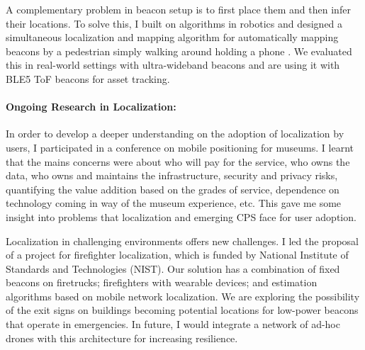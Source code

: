 \documentclass[11pt]{article}
\begin{document}
A complementary problem in beacon setup is to first place them and then infer their locations. %
To solve this, I built on algorithms in robotics and designed a simultaneous localization and mapping algorithm for automatically mapping beacons by a pedestrian simply walking around holding a phone \cite{mobileAR}. We evaluated this in real-world settings with ultra-wideband beacons and are using it with BLE5 ToF beacons for asset tracking. 

\paragraph{Ongoing Research in Localization: }
In order to develop a deeper understanding on the adoption of localization by users, I participated in a conference on mobile positioning for museums. 
I learnt that the mains concerns were about who will pay for the service, who owns the data, who owns and maintains the infrastructure, security and privacy risks, quantifying the value addition based on the grades of service, dependence on technology coming in way of the museum experience, etc. This gave me some insight into problems that localization and emerging CPS face for user adoption.

Localization in challenging environments offers new challenges. I led the proposal of a project for firefighter localization, which is funded by National Institute of Standards and Technologies (NIST). Our solution has a combination of fixed beacons on firetrucks; firefighters with wearable devices; and estimation algorithms based on mobile network localization. We are exploring the possibility of the exit signs on buildings becoming potential locations for low-power beacons that operate in emergencies. %
In future, I would integrate a network of ad-hoc drones with this architecture for increasing resilience.\\  %
\end{document}
